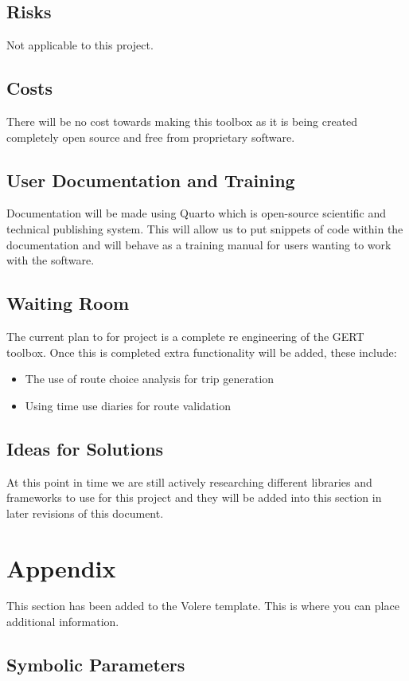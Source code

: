 \documentclass[12pt, titlepage]{article}
\begin{document}
\subsection{Risks}
Not applicable to this project. 
\subsection{Costs}
There will be no cost towards making this  toolbox as it is being created completely open source and free from proprietary software.
\subsection{User Documentation and Training}
Documentation will be made using Quarto which is open-source scientific and technical publishing system. This will allow us to put snippets of code within the documentation and will behave as a training manual for users wanting to work with the software. 
\subsection{Waiting Room}
The current plan to for project is a complete re engineering of the GERT toolbox. Once this is completed extra functionality will be added, these include: 
\begin{itemize}
    \item The use of route choice analysis for trip generation 
    \item Using time use diaries for route validation 
\end{itemize}
\subsection{Ideas for Solutions}
At this point in time we are still actively researching different libraries and frameworks to use for this project and they will be added into this section in later revisions of this document. 

\newpage

\section{Appendix}
This section has been added to the Volere template.  This is where you can place
additional information.

\subsection{Symbolic Parameters}
\end{document}
